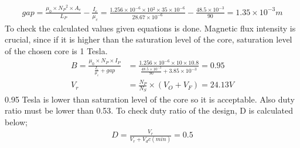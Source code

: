 \begin{align}
    gap=\frac{\mu_0\times N_P{^2}\times A_e }{L_P}-\frac{I_e}{\mu_c}=\frac{1.256\times 10^{-6}\times 10{^2}\times 35\times 10^{-6}}{28.67\times 10^{-6}}-\frac{48.5\times 10^{-3}}{90}=1.35\times 10^{-3}m
\end{align}
To check the calculated values given equations is done. Magnetic flux intensity is crucial, since if it is higher than the saturation level of the core, saturation level of the chosen core is 1 Tesla.
\begin{align}
    B=\frac{\mu_0\times N_P\times I_P}{\frac{I_e}{\mu_c}+gap}&=\frac{1.256\times 10^{-6}\times 10\times 10.8}{\frac{48.5\times 10^{-3}}{90}+3.85\times 10^{-3}}=0.95\\
    V_r&=\frac{N_P}{N_S}\times (V_O+V_F)=24.13 V
\end{align}
0.95 Tesla is lower than saturation level of the core so it is acceptable. Also duty ratio must be lower than 0.53. To check duty ratio of the design, D is calculated below;
\begin{align}
    D=\frac{V_r}{V_r+V{_dc(min)}}=0.5
\end{align}

